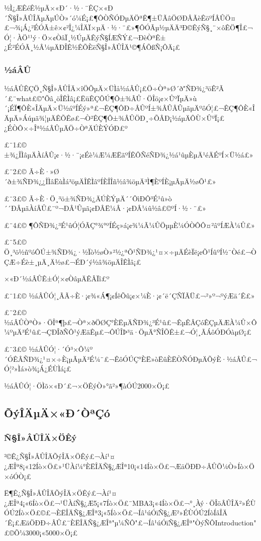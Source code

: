 ½Ì¿ÆÊéÊ½µÄ×«Ð´·½·¨ÊÇ×«Ð´Ñ§Î»ÂÛÎÄµÄµÚÒ»´ó¼É¡£¶ÔÒÑÓÐµÄÖªÊ¶±ÜÃâÖØÐÂÃèÊöºÍÂÛÖ¤£¬¾¡Á¿²ÉÓÃ±ê×¢²Î¿¼ÎÄÏ×µÄ·½·¨£»¶ÔÓÃµ½µÄÄ³Ð©ÊýÑ§¸¨×ôÊÖ¶Î£¬Ó¦·ÀÖ¹¹ý·Ö×¢ÒâÏ¸½ÚµÄÊýÑ§ÍÆÑÝ£¬ÐèÒªÊ±¿É²ÉÓÃ¸½Â¼µÄÐÎÊ½ÊÕÈëÑ§Î»ÂÛÎÄ¹©¶ÁÕßÑ¡ÔÄ¡£

\subsubsection{½áÂÛ}

½áÂÛÊÇÖ¸Ñ§Î»ÂÛÎÄ×îÖÕµÄ×ÜÌå½áÂÛ¡£Ö÷Òª»Ø´ð"ÑÐ¾¿³öÊ²Ã´£¨what£©"Õâ¸öÎÊÌâ¡£ËüÊÇÔÚ¶Ô±¾ÂÛ·ÖÎö¡¢×ÛºÏµÄ»ù´¡ÉÏ¶ÔÈ«ÎÄµÄ×Ü½áºÍÉý»ª£¬ÊÇ¶ÔÐ÷ÂÛºÍ±¾ÂÛÂÛµãµÄºôÓ¦£¬ÊÇ¶ÔÈ«ÎÄµÄ»­Áúµã¾¦µÄÊÕÊø£¬Ò²ÊÇ¶Ô±¾ÂÛÖÐ¸÷ÕÂÐ¡½áµÄÔÙ×ÛºÏ¡£¿ÉÒÔ×÷Îª½áÂÛµÄÖ÷ÒªÄÚÈÝÓÐ£º

£¨1£©	±¾¿ÎÌâµÄÀíÂÛ¡¢·½·¨¡¢Éè¼Æ¼ÆËãºÍÊÔÑéÑÐ¾¿½á¹ûµÈµÄ¹éÄÉºÍ×Ü½á£»

£¨2£©	Ã÷È·»Ø´ð±¾ÑÐ¾¿¿ÎÌâËùÌá³öµÄÎÊÌâºÍÈÎÎñ½â¾öµÄ³Ì¶ÈºÍÈ¡µÃµÄ½øÕ¹£»

£¨3£©	Ã÷È·Ö¸³ö±¾ÑÐ¾¿ÄÚÈÝµÄ´´ÔìÐÔ³É¹û»ò´´ÐÂµãÀíÂÛ£¨º¬ÐÂ¹Ûµã¡¢ÐÂË¼Â·¡¢ÐÂ¼û½â£©ºÍ·½·¨£»

£¨4£©	¶ÔÑÐ¾¿³É¹ûÓ¦ÓÃÇ°¾°ºÍÉç»á¡¢¾­¼Ã¼ÛÖµµÈ¼ÓÒÔÔ¤²âºÍÆÀ¼Û£»

£¨5£©	Ö¸³ö½ñºóÔÚ±¾ÑÐ¾¿·½Ïò½øÒ»²½¿ªÕ¹ÑÐ¾¿¹¤×÷µÄÉèÏë¡¢Õ¹ÍûºÍ½¨Òé£¬ÒÇÆ÷Éè±¸µÄ¸Ä½ø£¬ÉÐ´ý½â¾öµÄÎÊÌâ¡£

×«Ð´½áÂÛÊ±Ó¦×¢ÒâµÄÊÂÏî£º

£¨1£©	½áÂÛÓ¦¸ÃÃ÷È·¡¢¾«Á¶¡¢ÍêÕû¡¢×¼È·¡¢´ë´ÇÑÏÃÜ£¬²»º¬ºýÆä´Ê£»

£¨2£©	½áÂÛÒªÒ»·ÖÎª¶þ£¬Òª×ðÖØÇ°ÈËµÄÑÐ¾¿³É¹û£¬ÊµÊÂÇóÊÇµÄÆÀ¼Û×Ô¼ºµÄ³É¹û£¬ÇÐÎðÑÔ¹ýÆäÊµ£¬ÔÚÎÞ³ä·ÖµÄ°ÑÎÕÊ±£¬Ó¦¸ÃÁôÓÐÓàµØ¡£

£¨3£©	½áÂÛÓ¦·´Ó³×Ô¼º´ÓÊÂÑÐ¾¿¹¤×÷È¡µÃµÄ³É¼¨£¬ÊôÓÚÇ°ÈË»òËûÈËÒÑÓÐµÄÕýÈ·½áÂÛ£¬Ó¦²»Ìá»ò¾¡Á¿ÉÙÌá¡£

½áÂÛÓ¦·ÖÌõ×«Ð´£¬×ÖÊýÒ»°ã²»¶àÓÚ2000×Ö¡£


\subsection{ÕýÎÄµÄ×«Ð´ÒªÇó}

\subsubsection{Ñ§Î»ÂÛÎÄ×ÖÊý}

²©Ê¿Ñ§Î»ÂÛÎÄÕýÎÄ×ÖÊý£¬Àí¹¤¿ÆÎª8¡«12Íò×Ö£»¹ÜÀí¼°ÈËÎÄÑ§¿ÆÎª10¡«14Íò×Ö£¬ÆäÖÐÐ÷ÂÛÕ¼Ò»Íò×Ö×óÓÒ¡£

Ë¶Ê¿Ñ§Î»ÂÛÎÄÕýÎÄ×ÖÊý£¬Àí¹¤¿ÆÎª4¡«6Íò×Ö£¬¹ÜÀíÑ§¿Æ5¡«7Íò×Ö£¨MBA3¡«4Íò×Ö£¬°¸Àý·ÖÎöÂÛÎÄ²»ÉÙÓÚ2Íò×Ö£©£¬ÈËÎÄÑ§¿ÆÎª3¡«5Íò×Ö£¬Íâ¹úÓïÑ§¿Æ²»ÉÙÓÚ2ÍòÍâÎÄ´Ê¡£ÆäÖÐÐ÷ÂÛ£¨ÈËÎÄÑ§¿ÆÎª"µ¼ÑÔ"£¬Íâ¹úÓïÑ§¿ÆÎª"ÒýÑÔIntroduction"£©Õ¼3000¡«5000×Ö¡£

